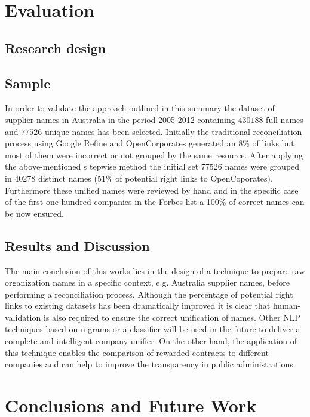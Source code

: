 \documentclass{llncs}
\begin{document}
% 
\section{Evaluation}

\subsection{Research design}
% 
\subsection{Sample}
In order to validate the approach outlined in this summary the dataset of supplier names in Australia in the period 2005-2012 containing $430188$ full names 
and $77526$ unique names has been selected. Initially the traditional reconciliation process using 
Google Refine and OpenCorporates generated an 8\% of links but most of them were 
incorrect or not grouped by the same resource. After applying the above-mentioned s
tepwise method the initial set $77526$ names were grouped in $40278$ 
distinct names (51\% of potential right links to OpenCoporates). 
Furthermore these unified names were reviewed by hand and in the specific case 
of the first one hundred companies in the Forbes list a 100\% of correct names can be now ensured.
 
\subsection{Results and Discussion}
The main conclusion of this works lies in the design of a technique to prepare 
raw organization names in a specific context, e.g. Australia supplier names,  
before performing a reconciliation process. Although the percentage of potential 
right links to existing datasets has been dramatically improved it is clear that 
human-validation is also required to ensure the correct unification of names. 
Other NLP techniques based on n-grams or a classifier will be used in the future 
to deliver a complete and intelligent company unifier. On the other hand, the 
application of this technique enables the comparison of rewarded contracts to 
different companies and can help to improve the transparency in public 
administrations.

\section{Conclusions and Future Work}




\end{document}
